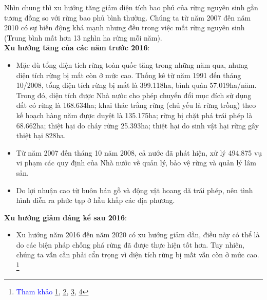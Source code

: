 \documentclass[a4paper,12pt]{report}
\begin{document}
\begin{flushleft}
	Nhìn chung thì xu hướng tăng giảm diện tích bao phủ của rừng nguyên sinh gần tương đồng so với rừng bao phủ bình thường. Chúng ta từ năm 2007 đến năm 2010 có sự biến động khá mạnh nhưng đều trong việc mất rừng nguyên sinh (Trung bình mất hơn 13 nghìn ha rừng mỗi năm).
	\\[\baselineskip]

	\textbf{Xu hướng tăng của các năm trước 2016}:
	\begin{itemize}

		\item Mặc dù tổng diện tích rừng toàn quốc tăng trong những năm qua, nhưng diện tích rừng bị mất còn ở mức cao. Thống kê từ năm 1991 đến tháng 10/2008, tổng diện tích rừng bị mất là 399.118ha, bình quân 57.019ha/năm. Trong đó, diện tích được Nhà nước cho phép chuyển đổi mục đích sử dụng đất có rừng là 168.634ha; khai thác trắng rừng (chủ yếu là rừng trồng) theo kế hoạch hàng năm được duyệt là 135.175ha; rừng bị chặt phá trái phép là 68.662ha; thiệt hại do cháy rừng 25.393ha; thiệt hại do sinh vật hại rừng gây thiệt hại 828ha.

		\item Từ năm 2007 đến tháng 10 năm 2008, cả nước đã phát hiện, xử lý 494.875 vụ vi phạm các quy định của Nhà nước về quản lý, bảo vệ rừng và quản lý lâm sản.

		\item Do lợi nhuận cao từ buôn bán gỗ và động vật hoang dã trái phép, nên tình hình diễn ra phức tạp ở hầu khắp các địa phương.
	\end{itemize}

	\textbf{Xu hướng giảm đáng kể sau 2016}:
	\begin{itemize}
		\item Xu hướng năm 2016 đến năm 2020 có xu hướng giảm dần, điều này có thể là do các biện pháp chống phá rừng đã được thực hiện tốt hơn. Tuy nhiên, chúng ta vẫn cần phải cẩn trọng vì diện tích rừng bị mất vẫn còn ở mức cao. \footnote{
			\textcolor{blue}{
			Tham khảo \underline{\href{https://thuvienphapluat.vn/van-ban/Tai-nguyen-Moi-truong/Quyet-dinh-38-2016-QD-TTg-bao-ve-phat-trien-rung-dau-tu-ho-tro-ket-cau-ha-tang-cong-ty-nong-lam-nghiep-322052.aspx}{1}}},
			\textcolor{blue}{\underline{\href{https://thuvienphapluat.vn/van-ban/Linh-vuc-khac/Luat-lam-nghiep-367277.aspx}{2}}},
			\textcolor{blue}{\underline{\href{https://thuvienphapluat.vn/van-ban/Doanh-nghiep/Thong-tu-02-2018-TT-BKHDT-huong-dan-thuc-hien-Quyet-dinh-38-2016-QD-TTg-phat-trien-rung-381913.aspx}{3}}},
			\textcolor{blue}{\underline{\href{https://thuvienphapluat.vn/van-ban/Tai-nguyen-Moi-truong/Thong-tu-13-2019-TT-BNNPTNT-trong-rung-thay-the-khi-chuyen-muc-dich-su-dung-rung-427115.aspx}{4}}}
		}
	\end{itemize}
\end{flushleft}
\end{document}

